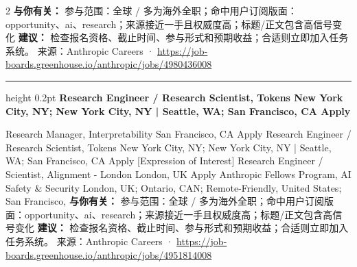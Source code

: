 \documentclass[10.5pt]{ctexart}
\begin{document}
\begin{multicols}{2}
\textbf{与你有关：} 参与范围：全球 / 多为海外全职；命中用户订阅版面：opportunity、ai、research；来源接近一手且权威度高；标题/正文包含高信号变化
\textbf{建议：} 检查报名资格、截止时间、参与形式和预期收益；合适则立即加入任务系统。
{\footnotesize\color{ormuted} 来源：Anthropic Careers · \url{https://job-boards.greenhouse.io/anthropic/jobs/4980436008}}
\vspace{2mm}
\hrule height 0.2pt
\vspace{2mm}
{\large\bfseries Research Engineer / Research Scientist, Tokens New York City, NY; New York City, NY | Seattle, WA; San Francisco, CA Apply}\par
[Expression of Interest] Research Manager, Interpretability San Francisco, CA Apply Research Engineer / Research Scientist, Tokens New York City, NY; New York City, NY | Seattle, WA; San Francisco, CA Apply [Expression of Interest] Research Engineer / Scientist, Alignment - London London, UK Apply Anthropic Fellows Program, AI Safety \& Security London, UK; Ontario, CAN; Remote-Friendly, United States; San Francisco, 
\textbf{与你有关：} 参与范围：全球 / 多为海外全职；命中用户订阅版面：opportunity、ai、research；来源接近一手且权威度高；标题/正文包含高信号变化
\textbf{建议：} 检查报名资格、截止时间、参与形式和预期收益；合适则立即加入任务系统。
{\footnotesize\color{ormuted} 来源：Anthropic Careers · \url{https://job-boards.greenhouse.io/anthropic/jobs/4951814008}}
\end{multicols}
\end{document}
